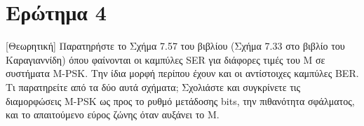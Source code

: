 \documentclass{article}
\begin{document}
        \begin{figure}[H]
        \end{figure}
        
        \begin{figure}[H]
        \end{figure}

\section{Ερώτημα 4}
 [Θεωρητική] Παρατηρήστε το Σχήμα 7.57 του βιβλίου (Σχήμα 7.33 στο βιβλίο του Καραγιαννίδη) όπου φαίνονται οι καμπύλες SER για διάφορες τιμές του Μ σε συστήματα M-PSK. Την ίδια μορφή περίπου έχουν και οι αντίστοιχες καμπύλες BER. Τι παρατηρείτε από τα δύο αυτά σχήματα; Σχολιάστε και συγκρίνετε τις διαμορφώσεις M-PSK ως προς το ρυθμό μετάδοσης bits, την πιθανότητα σφάλματος, και το απαιτούμενο εύρος ζώνης όταν αυξάνει το Μ.
 
\end{document}
